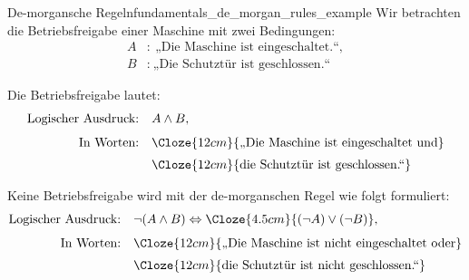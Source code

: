\begin{ExampleBox}{De-morgansche Regeln}{fundamentals_de_morgan_rules_example}
  Wir betrachten die Betriebsfreigabe einer Maschine mit zwei Bedingungen:
  \[
    \begin{aligned}
      A &: \ \text{„Die Maschine ist eingeschaltet.“},\\
      B &: \ \text{„Die Schutztür ist geschlossen.“}
    \end{aligned}
  \]

  Die Betriebsfreigabe lautet:
  \begin{align*}
    \text{Logischer Ausdruck:}\quad &A\land B,\\[0.4em]
    \text{In Worten:}\quad
      &\begin{aligned}[t]
        &\Cloze{12cm}{\text{„Die Maschine ist eingeschaltet und}}\\[0.25em]
        &\Cloze{12cm}{\text{die Schutztür ist geschlossen.“}}
      \end{aligned}
  \end{align*}

  Keine Betriebsfreigabe wird mit der de-morganschen Regel wie folgt
  formuliert:
  \begin{align*}
    \text{Logischer Ausdruck:}\quad
      &\neg(A\land B)\Leftrightarrow
        \Cloze{4.5cm}{(\neg A)\lor(\neg B)},\\[0.4em]
    \text{In Worten:}\quad
      &\begin{aligned}[t]
        &\Cloze{12cm}{\text{„Die Maschine ist nicht eingeschaltet oder}}\\[0.25em]
        &\Cloze{12cm}{\text{die Schutztür ist nicht geschlossen.“}}
      \end{aligned}
  \end{align*}
\end{ExampleBox}
